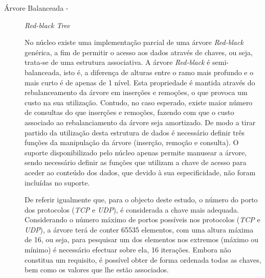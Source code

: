 \begin{description}


\item[Árvore Balanceada - ] \textit{Red-black Tree} 

No núcleo existe uma implementação parcial de uma árvore \textit{Red-black} genérica, a fim de permitir o acesso aos dados através de chaves, ou seja, trata-se de uma estrutura associativa.
A árvore \textit{Red-black} é semi-balanceada, isto é, a diferença de alturas entre o ramo mais profundo e o mais curto é de apenas de 1 nível.
Esta propriedade é mantida através do rebalanceamento da árvore em inserções e remoções, o que provoca um custo na sua utilização.
Contudo, no caso esperado, existe maior número de consultas do que inserções e remoções, fazendo com que o custo associado ao rebalanciamento da árvore seja amortizado.
De modo a tirar partido da utilização desta estrutura de dados é necessário definir três funções da manipulação da árvore (inserção, remoção e consulta).
O suporte disponibilizado pelo núcleo apenas permite manusear a árvore, sendo necessário definir as funções que utilizam a chave de acesso para aceder ao conteúdo dos dados, que devido à sua especificidade, não foram incluídas no suporte.

De referir igualmente que, para o objecto deste estudo, o número do porto dos protocolos (\textit{TCP} e \textit{UDP}), é considerada a chave mais adequada.
Considerando o número máximo de portos possíveis nos protocolos (\textit{TCP} e \textit{UDP}), a árvore terá de conter 65535 elementos, com uma altura máxima de 16, ou seja, para pesquisar um dos elementos nos extremos (máximo ou mínimo) é necessário efectuar sobre ela, 16 iterações.
Embora não constitua um requisito, é possível obter de forma ordenada todas as chaves, bem como os valores que lhe estão associados.


\end{description}
